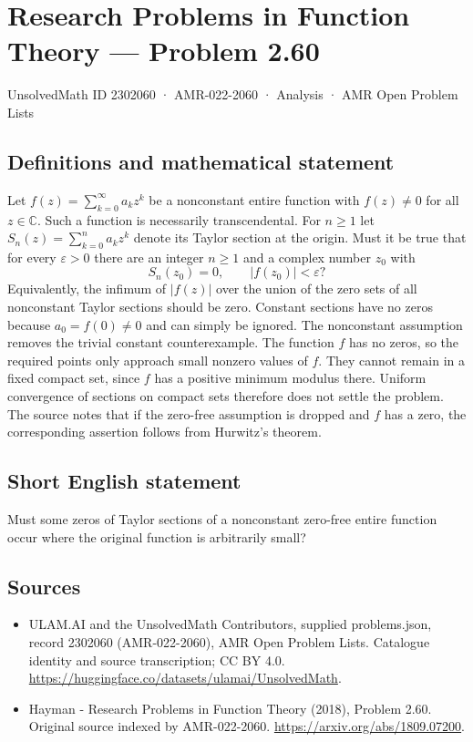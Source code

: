 \documentclass[11pt,a4paper]{article}
\begin{document}
\section*{Research Problems in Function Theory — Problem 2.60}\label{2302060}
{\small UnsolvedMath ID 2302060 · AMR-022-2060 · Analysis · AMR Open Problem Lists}
\subsection{Definitions and mathematical statement}
Let $f(z)=\sum_{k=0}^{\infty}a_kz^k$ be a nonconstant entire function with $f(z)\ne0$ for all $z\in\mathbb C$. Such a function is necessarily transcendental. For $n\ge1$ let
$S_n(z)=\sum_{k=0}^na_kz^k$ denote its Taylor section at the origin.
Must it be true that for every $\varepsilon>0$ there are an integer $n\ge1$ and a complex number $z_0$ with
\[
S_n(z_0)=0,\qquad |f(z_0)|<\varepsilon?
\]
Equivalently, the infimum of $|f(z)|$ over the union of the zero sets of all nonconstant Taylor sections should be zero. Constant sections have no zeros because $a_0=f(0)\ne0$ and can simply be ignored.
The nonconstant assumption removes the trivial constant counterexample. The function $f$ has no zeros, so the required points only approach small nonzero values of $f$. They cannot remain in a fixed compact set, since $f$ has a positive minimum modulus there. Uniform convergence of sections on compact sets therefore does not settle the problem. The source notes that if the zero-free assumption is dropped and $f$ has a zero, the corresponding assertion follows from Hurwitz's theorem.
\subsection{Short English statement}
Must some zeros of Taylor sections of a nonconstant zero-free entire function occur where the original function is arbitrarily small?
\subsection{Sources}
\begin{itemize}
\item[S1] ULAM.AI and the UnsolvedMath Contributors, supplied problems.json, record 2302060 (AMR-022-2060), AMR Open Problem Lists. Catalogue identity and source transcription; CC BY 4.0.
\url{https://huggingface.co/datasets/ulamai/UnsolvedMath}.
\item[S2] Hayman - Research Problems in Function Theory (2018), Problem 2.60. Original source indexed by AMR-022-2060.
\url{https://arxiv.org/abs/1809.07200}.
\end{itemize}
\end{document}

